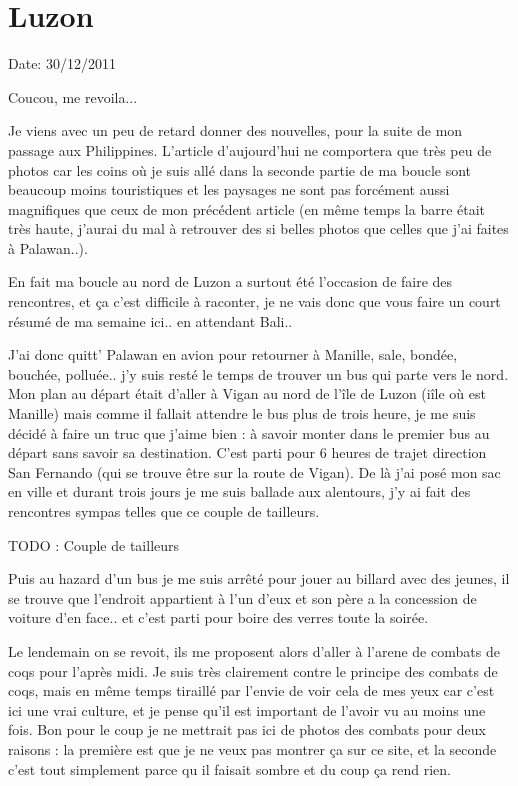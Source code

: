 \section{Luzon}

Date: 30/12/2011

\begin{multicols}{2}

Coucou, me revoila...

Je viens avec un peu de retard donner des nouvelles, pour la suite de mon passage aux Philippines. L'article d'aujourd'hui ne comportera que très peu de photos car les coins où je suis allé dans la seconde partie de ma boucle sont beaucoup moins touristiques et les paysages ne sont pas forcément aussi magnifiques que ceux de mon précédent article (en même temps la barre était très haute, j'aurai du mal à retrouver des si belles photos que celles que j'ai faites à Palawan..).

En fait ma boucle au nord de Luzon a surtout été l'occasion de faire des rencontres, et ça c'est difficile à raconter, je ne vais donc que vous faire un court résumé de ma semaine ici.. en attendant Bali..

J'ai donc quitt' Palawan en avion pour retourner à Manille, sale, bondée, bouchée, polluée.. j'y suis resté le temps de trouver un bus qui parte vers le nord. Mon plan au départ était d'aller à Vigan au nord de l'île de Luzon (iîle où est Manille) mais comme il fallait attendre le bus plus de trois heure, je me suis décidé à faire un truc que j'aime bien : à savoir monter dans le premier bus au départ sans savoir sa destination. C'est parti pour 6 heures de trajet direction San Fernando (qui se trouve être sur la route de Vigan). De là j'ai posé mon sac en ville et durant trois jours je me suis ballade aux alentours, j'y ai fait des rencontres sympas telles que ce couple de tailleurs.

TODO : Couple de tailleurs

Puis au hazard d'un bus je me suis arrêté pour jouer au billard avec des jeunes, il se trouve que l'endroit appartient à l'un d'eux et son père a la concession de voiture d'en face.. et c'est parti pour boire des verres toute la soirée.


Le lendemain on se revoit, ils me proposent alors d'aller à l'arene de combats de coqs pour l'après midi. Je suis très clairement contre le principe des combats de coqs, mais en même temps tiraillé par l'envie de voir cela de mes yeux car c'est ici une vrai culture, et je pense qu'il est important de l'avoir vu au moins une fois. Bon pour le coup je ne mettrait pas ici de photos des combats pour deux raisons : la première est que je ne veux pas montrer ça sur ce site, et la seconde c'est tout simplement parce qu il faisait sombre et du coup ça rend rien.


\end{multicols}

